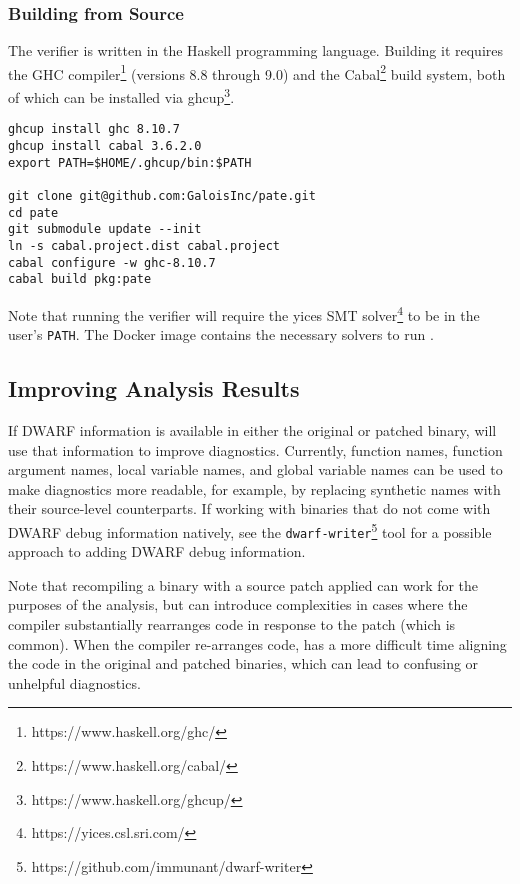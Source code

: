 \subsubsection{Building from Source}

The \TOOL{} verifier is written in the Haskell programming language. %
Building it requires the GHC compiler\footnote{https://www.haskell.org/ghc/} (versions 8.8 through 9.0) and the Cabal\footnote{https://www.haskell.org/cabal/} build system, both of which can be installed via ghcup\footnote{https://www.haskell.org/ghcup/}. %

\begin{lstlisting}
ghcup install ghc 8.10.7
ghcup install cabal 3.6.2.0
export PATH=$HOME/.ghcup/bin:$PATH

git clone git@github.com:GaloisInc/pate.git
cd pate
git submodule update --init
ln -s cabal.project.dist cabal.project
cabal configure -w ghc-8.10.7
cabal build pkg:pate

\end{lstlisting}

Note that running the verifier will require the yices SMT solver\footnote{https://yices.csl.sri.com/} to be in the user's \lstinline{PATH}. %
The Docker image contains the necessary solvers to run \TOOL{}. %

\subsection{Improving Analysis Results}

If DWARF information is available in either the original or patched binary, \TOOL{} will use that information to improve diagnostics. %
Currently, function names, function argument names, local variable names, and global variable names can be used to make diagnostics more readable, for example, by replacing synthetic names with their source-level counterparts. %
If working with binaries that do not come with DWARF debug information natively, see the \lstinline{dwarf-writer}\footnote{https://github.com/immunant/dwarf-writer} tool for a possible approach to adding DWARF debug information. %

Note that recompiling a binary with a source patch applied can work for the purposes of the analysis, but can introduce complexities in cases where the compiler substantially rearranges code in response to the patch (which is common). %
When the compiler re-arranges code, \TOOL{} has a more difficult time aligning the code in the original and patched binaries, which can lead to confusing or unhelpful diagnostics. %
